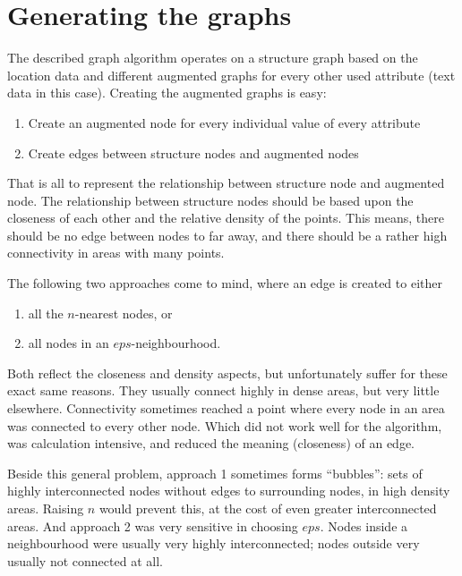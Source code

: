 \section{Generating the graphs}\label{sec:graph_generation}
The described graph algorithm operates on a structure graph based on the location data and different augmented graphs for every other used attribute (text data in this case). Creating the augmented graphs is easy: 
\begin{enumerate}
\item Create an augmented node for every individual value of every attribute
\item Create edges between structure nodes and augmented nodes
\end{enumerate}
%
That is all to represent the relationship between structure node and augmented node. The relationship between structure nodes should be based upon the closeness of each other and the relative density of the points. This means, there should be no edge between nodes to far away, and there should be a rather high connectivity in areas with many points.

The following two approaches come to mind, where an edge is created to either 
\begin{enumerate}
\item all the $n$-nearest nodes, or 
\item all nodes in an $eps$-neighbourhood.
\end{enumerate}
%
Both reflect the closeness and density aspects, but unfortunately suffer for these exact same reasons. They usually connect highly in dense areas, but very little elsewhere. Connectivity sometimes reached a point where every node in an area was connected to every other node. Which did not work well for the algorithm, was calculation intensive, and reduced the meaning (closeness) of an edge. 

Beside this general problem, approach 1 sometimes forms \enquote{bubbles}: sets of highly interconnected nodes without edges to surrounding nodes, in high density areas. Raising $n$ would prevent this, at the cost of even greater interconnected areas. And approach 2 was very sensitive in choosing $eps$. Nodes inside a neighbourhood were usually very highly interconnected; nodes outside very usually not connected at all.

